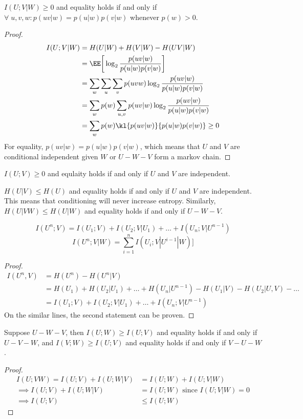 \begin{theorem}
$I(U;V|W) \geq 0$ and equality holds if and only if $\forall\;u,v,w: p(uv|w) = p(u|w)p(v|w)$ whenever $p(w) > 0$.
\end{theorem}
\begin{proof}
\begin{align*}
    I(U;V|W) &= H(U|W) + H(V|W) - H(UV|W) \\
    &= \EE\bigg[\log_2 \frac{p(uv|w)}{p(u|w)p(v|w)}\bigg] \\
    &= \sum_w \sum_u \sum_v p(uvw) \log_2 \frac{p(uv|w)}{p(u|w)p(v|w)} \\
    &= \sum_w p(w)\sum_{u,v} p(uv|w) \log_2 \frac{p(uv|w)}{p(u|w)p(v|w)} \\
    &= \sum_w p(w) \kl{p(uv|w)}{p(u|w)p(v|w)} \geq 0
\end{align*}
For equality, $p(uv|w) = p(u|w)p(v|w)$, which means that $U$ and $V$ are conditional independent given $W$ or $U-W-V$ form a markov chain.
\end{proof}
\begin{corollary}
$I(U;V) \geq 0$ and equlaity holds if and only if $U$ and $V$ are independent.
\end{corollary}
\begin{corollary}
$H(U|V) \leq H(U)$ and equality holds if and only if $U$ and $V$ are independent. This means that conditioning will never increase entropy. Similarly, $H(U|VW) \leq H(U|W)$ and equality holds if and only if $U-W-V$.
\end{corollary}
\begin{theorem}
\[I(U^n;V) = I(U_1;V) + I(U_2;V|U_1) + \dots + I(U_n;V|U^{n-1}) \]
\[ I(U^n; V|W) = \sum_{i=1}^n I(U_i;V | U^{i-1}|W) ]\]
\end{theorem}
\begin{proof}
\begin{align*}
I(U^n,V) &= H(U^n) - H(U^n|V) \\
&= H(U_1) + H(U_2|U_1) + \dots + H(U_n|U^{n-1}) - H(U_1|V) - H(U_2|U,V) - \dots \\
&= I(U_1;V) + I(U_2;V|U_1) + \dots + I(U_n;V|U^{n-1})
\end{align*}
On the similar lines, the second statement can be proven.
\end{proof}
\begin{theorem}
Suppose $U-W-V$, then $I(U;W) \geq I(U;V)$ and equality holds if and only if $U-V-W$, and $I(V;W) \geq I(U;V)$ and equality holds if and only if $V-U-W$.
\end{theorem}
\begin{proof}
\begin{align*}
I(U;VW) = I(U;V) + I(U;W|V) &= I(U;W) + I(U;V|W) \\
\implies I(U;V) + I(U;W|V) &= I(U;W) \text{ since } I(U;V|W) = 0 \\
\implies I(U;V) &\leq I(U;W)
\end{align*}
\end{proof}
